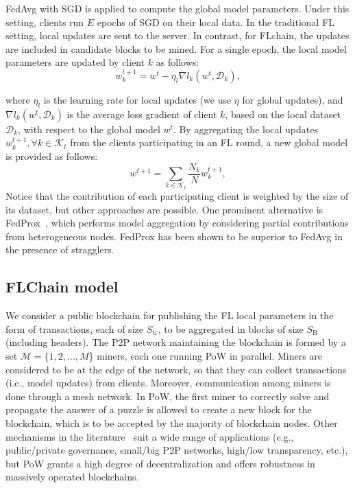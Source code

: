 \documentclass[lettersize,journal]{IEEEtran}
\begin{document}
FedAvg with SGD is applied to compute the global model parameters. Under this setting, clients run $E$ epochs of SGD on their local data. In the traditional FL setting, local updates are sent to the server. In contrast, for FLchain, the updates are included in candidate blocks to be mined. For a single epoch, the local model parameters are updated by client $k$ as follows:
\begin{equation}
w_k^{t+1} = w^t - \eta_l \nabla l_{k}(w^t,\mathcal{D}_k),
\label{eq:2}
\end{equation}

where $\eta_l$ is the learning rate for local updates (we use $\eta$ for global updates), and $\nabla l_{k}(w^t,\mathcal{D}_k)$ is the average loss gradient of client $k$, based on the local dataset $\mathcal{D}_k$, with respect to the global model $w^t$. By aggregating the local updates $w_k^{t+1}, \forall k\in\mathcal{K}_t$ from the clients participating in an FL round, a new global model is provided as follows:
\begin{equation}
w^{t+1} = \sum_{k\in \mathcal{K}_t} \frac{N_k}{N} w_{k}^{t+1},
\label{eq:3}
\end{equation}
Notice that the contribution of each participating client is weighted by the size of its dataset, but other approaches are possible. One prominent alternative is FedProx~\cite{li2020federated}, which performs model aggregation by considering partial contributions from heterogeneous nodes. FedProx has been shown to be superior to FedAvg in the presence of stragglers.

\subsection{FLChain model}
\label{section:bc_model}

We consider a public blockchain for publishing the FL local parameters in the form of transactions, each of size $S_\text{tr}$, to be aggregated in blocks of size $S_\text{B}$ (including headers). The P2P network maintaining the blockchain is formed by a set $\mathcal{M} = \{1, 2, ..., M$\} miners, each one running PoW in parallel. Miners are considered to be at the edge of the network, so that they can collect transactions (i.e., model updates) from clients. Moreover, communication among miners is done through a mesh network. In PoW, the first miner to correctly solve and propagate the answer of a puzzle is allowed to create a new block for the blockchain, which is to be accepted by the majority of blockchain nodes. Other mechanisms in the literature~\cite{nguyen2018survey} suit a wide range of applications (e.g., public/private governance, small/big P2P networks, high/low transparency, etc.), but PoW grants a high degree of decentralization and offers robustness in massively operated blockchains.
\end{document}
